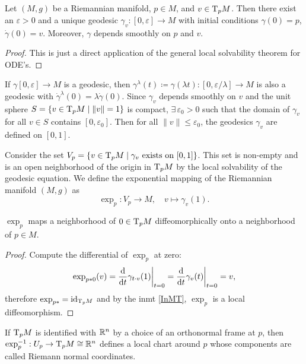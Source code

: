 \begin{lem}
    Let $(M,g)$ be a Riemannian manifold, $p\in M$, and $v\in \mathrm{T}_p M$. Then there exist an $\varepsilon>0$ and a unique geodesic $\gamma_v:[0,\varepsilon]\to M$ with initial conditions $\gamma(0)=p$, $\dot\gamma(0)=v$. Moreover, $\gamma $ depends smoothly on $p$ and $v$.
\end{lem}
\begin{proof}
    This is just a direct application of the general local solvability theorem for ODE's.
\end{proof}
\begin{cor}
    If $\gamma[0,\varepsilon]\to M$ is a geodesic, then $\gamma^\lambda(t)\coloneqq \gamma(\lambda t):[0,\varepsilon/\lambda]\to M$ is also a geodesic with $\dot\gamma^\lambda(0)=\lambda\dot\gamma(0)$. Since $\gamma_v$ depends smoothly on $v$ and the unit sphere $S=\{v\in \mathrm{T}_pM\mid \lVert v\rVert=1\}$ is compact, $\exists\,\varepsilon_0>0$ such that the domain of $\gamma_v$ for all $v\in S$ contains $[0,\varepsilon_0]$. Then for all $\lVert v\rVert\leq \varepsilon_0$, the geodesics $\gamma_v$ are defined on $[0,1]$.
\end{cor}
\begin{defn}
    Consider the set $V_p=\{v\in \mathrm{T}_p M\mid \gamma_v \text{ exists on }[0,1]\}$. This set is non-empty and is an open neighborhood of the origin in $\mathrm{T}_p M$ by the local solvability of the geodesic equation. We define the exponential mapping of the Riemannian manifold $(M,g)$ as
    \[\exp_p :V_p\to M,\quad v\mapsto \gamma_v(1).\]
\end{defn}

\begin{thm}
    $\exp_p$ maps a neighborhood of $0\in \mathrm{T}_pM$ diffeomorphically onto a neighborhood of $p\in M$.
\end{thm}
\begin{proof}
    Compute the differential of $\exp_p$ at zero:
    \[\exp_{p\ast0}(v)=\restr{\frac{\dd}{\dd t}\gamma_{t\cdot v}(1)}{t=0}=\restr{\frac{\dd}{\dd t}\gamma_{v}(t)}{t=0}=v,\]
    therefore $\exp_{p\ast}=\operatorname{id}_{\mathrm{T}_p M}$ and by the \gls{inmt} \ref{InMT}, $\exp_p$ is a local diffeomorphism.
\end{proof}

\begin{defn}
    If $\mathrm{T}_p M$ is identified with $\mathbb{R}^n$ by a choice of an orthonormal frame at $p$, then $\exp_p^{-1}:U_p\to \mathrm{T}_p M\cong\mathbb{R}^n$ defines a local chart around $p$ whose components are called Riemann normal coordinates.
\end{defn}

